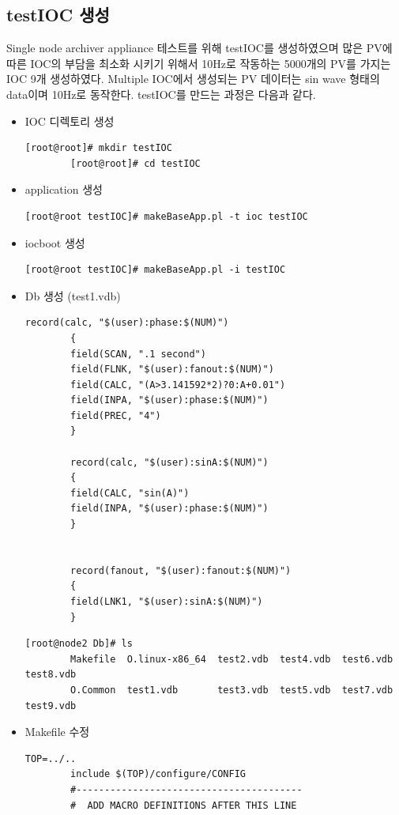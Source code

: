\documentclass[11pt
  , a4paper
  , article
  , oneside
]{memoir}
\begin{document}
	\subsection{testIOC 생성}
	Single node archiver appliance 테스트를 위해 testIOC를 생성하였으며 많은 PV에 따른 IOC의 부담을 최소화 시키기 위해서 10Hz로 작동하는 5000개의 PV를 가지는 IOC 9개 생성하였다. Multiple IOC에서 생성되는 PV 데이터는 sin wave 형태의 data이며 10Hz로 동작한다. testIOC를 만드는 과정은 다음과 같다.
	\begin{itemize}
		\item IOC 디렉토리 생성
		\begin{lstlisting}[style=termstyle]
		[root@root]# mkdir testIOC
		[root@root]# cd testIOC
		\end{lstlisting}
		\item application 생성
		\begin{lstlisting}[style=termstyle]
		[root@root testIOC]# makeBaseApp.pl -t ioc testIOC
		\end{lstlisting}
		\item iocboot 생성
		\begin{lstlisting}[style=termstyle]
		[root@root testIOC]# makeBaseApp.pl -i testIOC
		\end{lstlisting}
		\item Db 생성 (test1.vdb)
		\begin{lstlisting}[style=termstyle]
		record(calc, "$(user):phase:$(NUM)") 
		{
		field(SCAN, ".1 second")
		field(FLNK, "$(user):fanout:$(NUM)")
		field(CALC, "(A>3.141592*2)?0:A+0.01")
		field(INPA, "$(user):phase:$(NUM)")
		field(PREC, "4")
		}
		
		record(calc, "$(user):sinA:$(NUM)")
		{
		field(CALC, "sin(A)")
		field(INPA, "$(user):phase:$(NUM)")
		}
		
		
		record(fanout, "$(user):fanout:$(NUM)")
		{
		field(LNK1, "$(user):sinA:$(NUM)")
		}
		\end{lstlisting}
		\begin{lstlisting}[style=termstyle]
		[root@node2 Db]# ls
		Makefile  O.linux-x86_64  test2.vdb  test4.vdb  test6.vdb  test8.vdb
		O.Common  test1.vdb       test3.vdb  test5.vdb  test7.vdb  test9.vdb
		\end{lstlisting}
		\item Makefile 수정
		\begin{lstlisting}[style=termstyle]
		TOP=../..
		include $(TOP)/configure/CONFIG
		#----------------------------------------
		#  ADD MACRO DEFINITIONS AFTER THIS LINE
		

\end{lstlisting}
\end{itemize}
\end{document}
